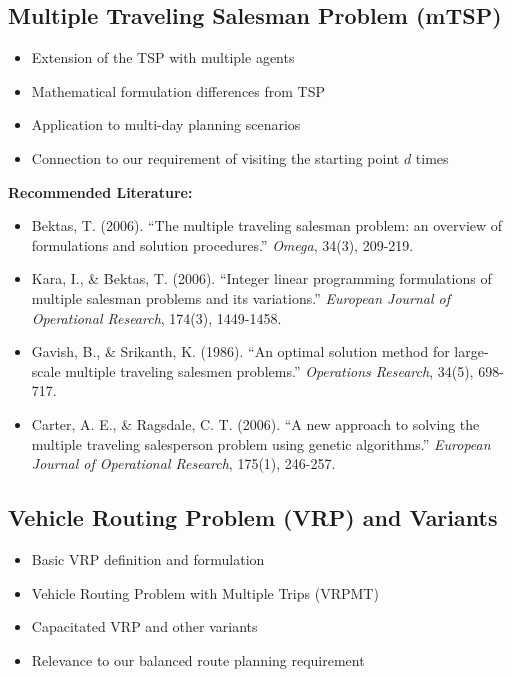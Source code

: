\subsection{Multiple Traveling Salesman Problem (mTSP)}
\begin{itemize}
    \item Extension of the TSP with multiple agents
    \item Mathematical formulation differences from TSP
    \item Application to multi-day planning scenarios
    \item Connection to our requirement of visiting the starting point $d$ times
\end{itemize}

\noindent\textbf{Recommended Literature:}
\begin{itemize}
    \item Bektas, T. (2006). ``The multiple traveling salesman problem: an overview of formulations and solution procedures.'' \textit{Omega}, 34(3), 209-219.
    \item Kara, I., \& Bektas, T. (2006). ``Integer linear programming formulations of multiple salesman problems and its variations.'' \textit{European Journal of Operational Research}, 174(3), 1449-1458.
    \item Gavish, B., \& Srikanth, K. (1986). ``An optimal solution method for large-scale multiple traveling salesmen problems.'' \textit{Operations Research}, 34(5), 698-717.
    \item Carter, A. E., \& Ragsdale, C. T. (2006). ``A new approach to solving the multiple traveling salesperson problem using genetic algorithms.'' \textit{European Journal of Operational Research}, 175(1), 246-257.
\end{itemize}

\subsection{Vehicle Routing Problem (VRP) and Variants}
\begin{itemize}
    \item Basic VRP definition and formulation
    \item Vehicle Routing Problem with Multiple Trips (VRPMT)
    \item Capacitated VRP and other variants
    \item Relevance to our balanced route planning requirement
\end{itemize}

